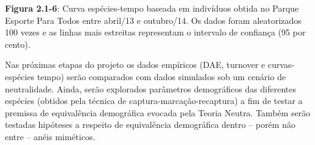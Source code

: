 \textbf{Figura 2.1-6}: Curva espécies-tempo baseada em indivíduos obtida no Parque Esporte Para Todos entre abril/13 e outubro/14. Os dados foram aleatorizados 100 vezes e as linhas mais estreitas representam o intervalo de confiança (95 por cento).

Nas próximas etapas do projeto os dados empíricos (DAE, turnover e curvas-espécies tempo) serão comparados com dados simulados sob um cenário de neutralidade. Ainda, serão explorados parâmetros demográficos das diferentes espécies (obtidos pela técnica de captura-marcação-recaptura) a fim de testar a premissa de equivalência demográfica evocada pela Teoria Neutra. Também serão testadas hipóteses a respeito de equivalência demográfica dentro – porém não entre – anéis miméticos.